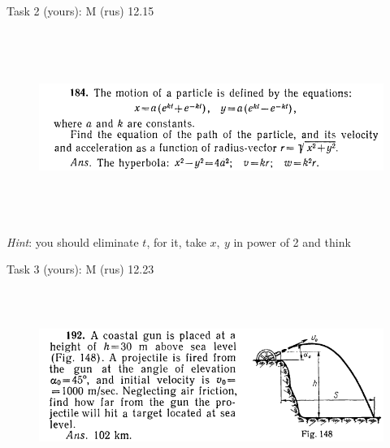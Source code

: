 \documentclass[aspectratio=169,xcolor=table,10pt, notes=hide]{beamer}
\newcommand{\fbckg}[1]{\usebackgroundtemplate{\texttt{[image: \#1]}}}%
\begin{document}
    \begin{frame}[t]{Task 2 (yours): M (rus) 12.15
        }
    \framesubtitle{}
        \begin{figure}[H]
            \centering\includegraphics[height=6cm,width=1\textwidth,keepaspectratio]{image41.png}
            \label{fig:image41}
        \end{figure}
        \alert{\textit{Hint}: you should eliminate $t$, for it, take $x,\ y$ in power of 2 and think}
    \end{frame}
    
    \begin{frame}[t]{Task 3 (yours): M (rus) 12.23
        }
    \framesubtitle{}
        \begin{figure}[H]
            \centering\includegraphics[height=6cm,width=1\textwidth,keepaspectratio]{image42.png}
            \label{fig:image42}
        \end{figure}
    \end{frame}

\fbckg{fibeamer/figs/last_page.png}
\frame[plain]{}
\fbckg{fibeamer/figs/common.png}
\end{document}
